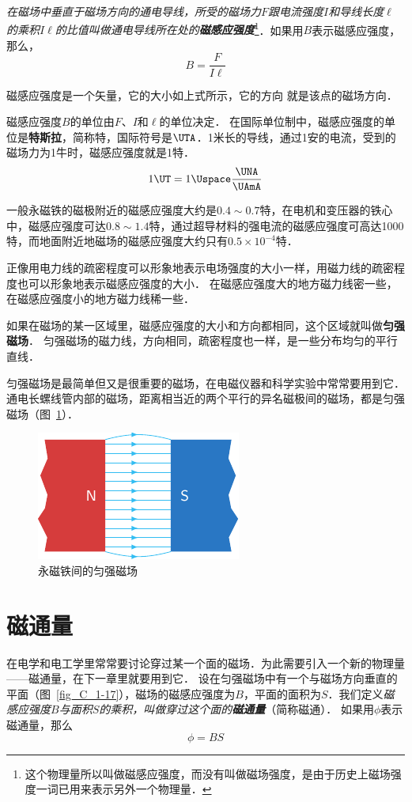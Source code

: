 \textit{在磁场中垂直于磁场方向的通电导线，所受的磁场力$F$跟电流强度$I$和导线长度$\ell$的乘积$I\ell$的比值叫做通电导线所在处的\textbf{磁感应强度}}\footnote{这个物理量所以叫做磁感应强度，而没有叫做磁场强度，是由于历史上磁场强度一词已用来表示另外一个物理量．}．如果用$B$表示磁感应强度，那么，
\[B=\frac{F}{I\ell}\]

磁感应强度是一个矢量，它的大小如上式所示，它的方向
就是该点的磁场方向．

磁感应强度$B$的单位由$F$、$I$和$\ell$的单位决定．
在国际单位制中，磁感应强度的单位是\textbf{特斯拉}，简称特，国际符号是$ \UTA $．1米长的导线，通过1安的电流，受到的磁场力为1牛时，磁感应强度就是1特．
\[1\UT =1 \Uspace \frac{\UNA}{\UAmA}\]

一般永磁铁的磁极附近的磁感应强度大约是$0.4 \sim 0.7$特，在电机和变压器的铁心中，磁感应强度可达$0.8 \sim 1.4$特，通过超导材料的强电流的磁感应强度可高达1000特，而地面附近地磁场的磁感应强度大约只有$0.5\times 10^{-4}$特．

正像用电力线的疏密程度可以形象地表示电场强度的大小一样，用磁力线的疏密程度也可以形象地表示磁感应强度的大小．
在磁感应强度大的地方磁力线密一些，在磁感应强度小的地方磁力线稀一些．

如果在磁场的某一区域里，磁感应强度的大小和方向都相同，这个区域就叫做\textbf{匀强磁场}．
匀强磁场的磁力线，方向相同，疏密程度也一样，是一些分布均匀的平行直线．

匀强磁场是最简单但又是很重要的磁场，在电磁仪器和科学实验中常常要用到它．
通电长螺线管内部的磁场，距离相当近的两个平行的异名磁极间的磁场，都是匀强磁场（图~\ref{fig_C_1-16}）．

\begin{figure}[htbp]
    \centering
    \includegraphics{fig/C/1-16.pdf}
    \caption{永磁铁间的匀强磁场}\label{fig_C_1-16}
\end{figure}

\section{磁通量}
在电学和电工学里常常要讨论穿过某一个面的磁场．为此需要引入一个新的物理量——磁通量，在下一章里就要用到它．
设在匀强磁场中有一个与磁场方向垂直的平面（图~\ref{fig_C_1-17}），磁场的磁感应强度为$B$，平面的面积为$S$．我们定义\textit{磁感应强度$B$与面积$S$的乘积，叫做穿过这个面的\textbf{磁通量}}（简称磁通）．
如果用$\phi$表示磁通量，那么
\[\phi=BS \]

